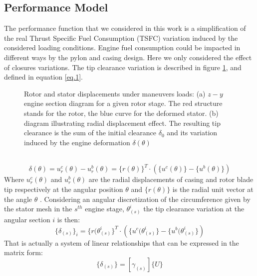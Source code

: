 \subsection{Performance Model}
\label{ssec1.2.2}
The performance function that we considered in this work is a simplification of the real Thrust Specific Fuel Consumption (TSFC) variation induced by the considered loading conditions. Engine fuel consumption could be impacted in different ways by the pylon and casing design. Here we only considered the effect of closures variations.
The tip clearance variation is described in figure \ref{f.2}, and defined in equation \eqref{eq.1}.
  \\
  \begin{figure}[hbt!]
  \centering
       \caption{Rotor and stator displacements under maneuvers loads: (a) $z-y$ engine section diagram for a given rotor stage. The red structure stands for the rotor, the blue curve for the deformed stator. (b) diagram illustrating radial displacement effect.
       The resulting tip clearance is the sum of the initial clearance $\delta_0$ and its variation induced by the engine deformation $\delta(\theta)$ }
       \label{f.2}
     \end{figure}
  \\
\begin{equation}
\label{eq.1}
\delta(\theta)=u_r^c(\theta)-u_r^b(\theta)=\lbrace r( \theta ) \rbrace^T \cdot \left( \lbrace u^c(\theta) \rbrace-\lbrace u^b(\theta) \rbrace\right)
\end{equation}
Where $u_r^c(\theta)$ and $u_r^b(\theta)$  are the radial displacements of casing and rotor blade tip respectively at the angular position $\theta$ and $\lbrace r( \theta ) \rbrace$ is the radial unit vector at the angle $\theta$ .
Considering an angular discretization of the circumference given by the stator mesh in the $s^{th}$ engine stage, $\theta^i_{(s)}$ the tip clearance variation at the angular section $i$ is then:	
\begin{equation}
\lbrace\delta_{(s)}\rbrace_i=\lbrace r( \theta^i_{(s) } \rbrace^T \cdot \left( \lbrace u^c(\theta^i_{(s)} \rbrace-\lbrace u^b(\theta^i_{(s)} \rbrace\right)
\end{equation}
That is actually a system of linear relationships that can be expressed in the matrix form:
\begin{equation}
\label{e.3}
\lbrace\delta_{(s)}\rbrace =\left[ \gamma_{(s)} \right] \lbrace U \rbrace
\end{equation}
